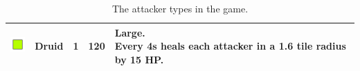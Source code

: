 \begin{table}[H]
\begin{tabular}{m{9mm}m{25mm}D{.}{.}{-1}rm{0.48\textwidth}}
        \includegraphics[height=7mm]{img/Icons/Attackers/Druid.png}                   & \footnotesize{Druid}                   & 1                   & 120              & \footnotesize{\textbf{Large.} \newline Every 4s heals each attacker in a 1.6 tile radius by 15 HP.}                                                         \\
        \bottomrule
    \end{tabular}
    \caption{The attacker types in the game.}
    \label{tab:attackers}
\end{table}
